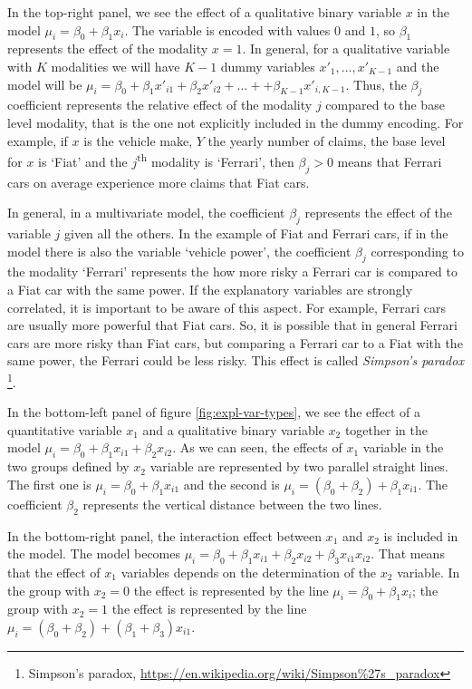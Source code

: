 \documentclass[a4paper, twoside, openright, 12pt]{report}
\theoremstyle{definition}
\theoremstyle{definition}
\theoremstyle{definition}
\theoremstyle{remark}
\begin{document}
In the top-right panel, we see the effect of a qualitative binary variable \(x\) in the model \(\mu_i = \beta_0 + \beta_1 x_i\). The variable is encoded with values \(0\) and \(1\), so \(\beta_1\) represents the effect of the modality \(x=1\). In general, for a qualitative variable with \(K\) modalities we will have \(K-1\) dummy variables \(x'_1, \dots, x'_{K-1}\) and the model will be \(\mu_i = \beta_0 + \beta_1 x'_{i1} + \beta_2 x'_{i2} + \dots + + \beta_{K-1} x'_{i, K-1}\). Thus, the \(\beta_j\) coefficient represents the relative effect of the modality \(j\) compared to the base level modality, that is the one not explicitly included in the dummy encoding. For example, if \(x\) is the vehicle make, \(Y\) the yearly number of claims, the base level for \(x\) is `Fiat' and the \(j\)\textsuperscript{th} modality is `Ferrari', then \(\beta_j>0\) means that Ferrari cars on average experience more claims that Fiat cars.

In general, in a multivariate model, the coefficient \(\beta_j\) represents the effect of the variable \(j\) given all the others. In the example of Fiat and Ferrari cars, if in the model there is also the variable `vehicle power', the coefficient \(\beta_j\) corresponding to the modality `Ferrari' represents the how more risky a Ferrari car is compared to a Fiat car with the same power. If the explanatory variables are strongly correlated, it is important to be aware of this aspect. For example, Ferrari cars are usually more powerful that Fiat cars. So, it is possible that in general Ferrari cars are more risky than Fiat cars, but comparing a Ferrari car to a Fiat with the same power, the Ferrari could be less risky. This effect is called \emph{Simpson's paradox} \footnote{Simpson's paradox, \url{https://en.wikipedia.org/wiki/Simpson\%27s_paradox}}.

In the bottom-left panel of figure \ref{fig:expl-var-types}, we see the effect of a quantitative variable \(x_1\) and a qualitative binary variable \(x_2\) together in the model \(\mu_i = \beta_0 + \beta_1 x_{i1} + \beta_2 x_{i2}\). As we can seen, the effects of \(x_1\) variable in the two groups defined by \(x_2\) variable are represented by two parallel straight lines. The first one is \(\mu_i = \beta_0 + \beta_1 x_{i1}\) and the second is \(\mu_i = \left(\beta_0 + \beta_2\right) + \beta_1 x_{i1}\). The coefficient \(\beta_2\) represents the vertical distance between the two lines.

In the bottom-right panel, the interaction effect between \(x_1\) and \(x_2\) is included in the model. The model becomes \(\mu_i = \beta_0 + \beta_1 x_{i1} + \beta_2 x_{i2} + \beta_3 x_{i1} x_{i2}\). That means that the effect of \(x_1\) variables depends on the determination of the \(x_2\) variable. In the group with \(x_2=0\) the effect is represented by the line \(\mu_i = \beta_0 + \beta_1 x_i\); the group with \(x_2=1\) the effect is represented by the line \(\mu_i = \left(\beta_0 + \beta_2\right) + \left(\beta_1 + \beta_3\right) x_{i1}\).
\end{document}

